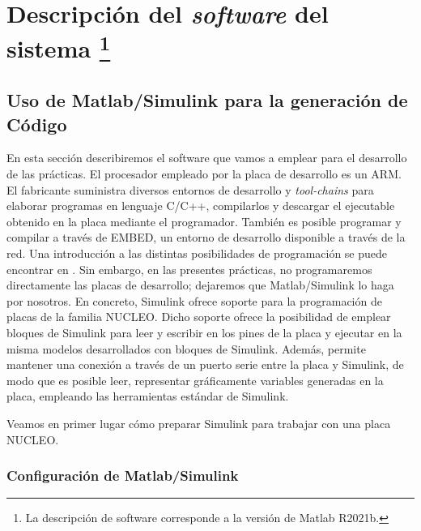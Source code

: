 \documentclass[10pt,a4paper]{report}
\begin{document}
\chapter{Descripción del \emph{software} del sistema \protect \footnote{La descripción de software corresponde a la versión de Matlab R2021b.}}
\section{Uso de Matlab/Simulink para la generación de Código}
En esta sección describiremos el software que vamos a emplear para el desarrollo de  las prácticas. El procesador empleado por la placa de desarrollo es un ARM. El fabricante suministra diversos entornos de desarrollo y \emph{tool-chains} para elaborar programas en lenguaje C/C++, compilarlos y descargar el ejecutable obtenido en la placa mediante el programador. También es posible programar y compilar a través de EMBED, un entorno de desarrollo disponible a través de la red. Una introducción a las distintas posibilidades de programación se puede encontrar en \cite{STNUCLEOSF}.
Sin embargo, en las presentes prácticas, no programaremos directamente las placas de desarrollo; dejaremos que Matlab/Simulink lo haga por nosotros. En concreto, Simulink ofrece soporte para la programación de placas de la familia NUCLEO.  Dicho soporte ofrece la posibilidad de emplear bloques de Simulink para leer y escribir en los pines de la placa y ejecutar en la misma modelos desarrollados con bloques de Simulink. Además, permite mantener una conexión a través de un puerto serie entre la placa y Simulink, de modo que es posible leer, representar gráficamente variables generadas en la placa, empleando las herramientas estándar de Simulink.

Veamos en primer lugar cómo preparar Simulink para trabajar con una placa NUCLEO.
\subsection{Configuración de Matlab/Simulink}
\end{document}
